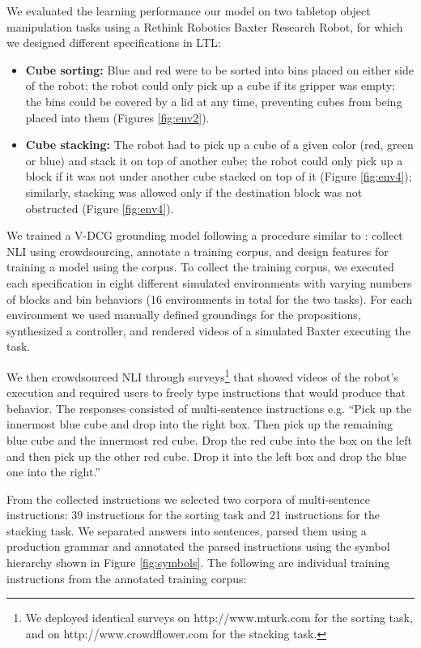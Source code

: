 \documentclass[letterpaper]{article} %
\begin{document}
We evaluated the learning performance our model on two tabletop object manipulation tasks using a Rethink Robotics Baxter Research Robot, for which we designed different specifications in LTL:
\begin{itemize}[nolistsep,noitemsep]
\item \textbf{Cube sorting:} Blue and red were to be sorted into bins placed on either side of the robot; the robot could only pick up a cube if its gripper was empty; the bins could be covered by a lid at any time, preventing cubes from being placed into them (Figures \ref{fig:env2}).

\item \textbf{Cube stacking:} The robot had to pick up a cube of a given color (red, green or blue) and stack it on top of another cube; the robot could only pick up a block if it was not under another cube stacked on top of it (Figure \ref{fig:env4}); similarly, stacking was allowed only if the destination block was not obstructed (Figure \ref{fig:env4}). 

\end{itemize}

We trained a V-DCG grounding model following a procedure similar to \cite{boteanu2016model}: collect NLI using crowdsourcing, annotate a training corpus, and design features for training a model using the corpus.
To collect the training corpus, we executed each specification in eight different simulated environments with varying numbers of blocks and bin behaviors (16 environments in total for the two tasks). For each environment we used manually defined groundings for the propositions, synthesized a controller, and rendered videos of a simulated Baxter executing the task.

We then crowdsourced NLI through surveys\footnote{We deployed identical surveys on http://www.mturk.com for the sorting task, and on http://www.crowdflower.com for the stacking task.}  that showed videos of the robot's execution and required users to freely type instructions that would produce that behavior. The responses consisted of multi-sentence instructions e.g. ``Pick up the innermost blue cube and drop into the right box. Then pick up the remaining blue cube and the innermost red cube. Drop the red cube into the box on the left and then pick up the other red cube. Drop it into the left box and drop the blue one into the right.'' 

From the collected instructions we selected two corpora of multi-sentence instructions: 39 instructions for the sorting task and 21 instructions for the stacking task.
We separated answers into sentences, parsed them using a production grammar and annotated the parsed instructions using the symbol hierarchy shown in Figure \ref{fig:symbols}.
The following are individual training instructions from the annotated training corpus:
\end{document}
